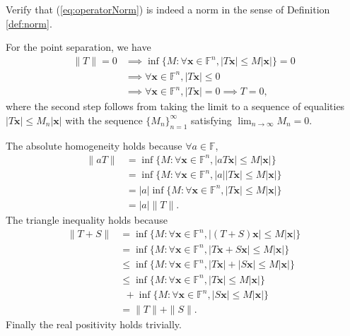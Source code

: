 \begin{exc}
  Verify that (\ref{eq:operatorNorm})
  is indeed a norm in the sense of Definition \ref{def:norm}.
\end{exc}
\begin{solution}
  For the point separation, we have
  \begin{displaymath}
    \begin{array}{rl}
    \|T\| = 0 & \implies \inf\{M: \forall \mathbf{x} \in
                \mathbb{F}^n, |T\mathbf{x}| \leq M|\mathbf{x}|\} =0
      \\ &\implies \forall \mathbf{x} \in \mathbb{F}^n,
           |T\mathbf{x}| \leq 0
      \\ &\implies \forall \mathbf{x} \in \mathbb{F}^n, |T\mathbf{x}| = 0 \implies T = 0,
    \end{array}
  \end{displaymath}
  where the second step follows from
  taking the limit to a sequence of equalities
  $|T\mathbf{x}|\le M_n |\mathbf{x}|$
  with the sequence $\{M_n\}_{n=1}^{\infty}$
  satisfying $\lim_{n\rightarrow \infty} M_n = 0$.

  The absolute homogeneity holds because $\forall a \in \mathbb{F}$, 
  \begin{displaymath}
    \begin{array}{rl}
      \|aT\| &= \inf\{M:\forall \mathbf{x} \in \mathbb{F}^n,|aT
               \mathbf{x} | \leq M|\mathbf{x}|\}
      \\ &= \inf\{M:\forall \mathbf{x} \in
           \mathbb{F}^n,|a||T\mathbf{x}| \leq M|\mathbf{x}|\}
      \\ &= |a|\inf\{M:\forall \mathbf{x} \in
           \mathbb{F}^n,|T\mathbf{x}| \leq M|\mathbf{x}|\}
      \\ &= |a|\|T\|.
    \end{array}
  \end{displaymath}
  The triangle inequality holds because
  \begin{displaymath}
    \begin{array}{rl}
      \|T + S\| &= \inf\{M: \forall \mathbf{x} \in \mathbb{F}^n,
                  |(T+S)\mathbf{x}| \leq M|\mathbf{x}|\}\\
        &= \inf\{M:\forall \mathbf{x} \in \mathbb{F}^n,
          |T\mathbf{x}+S\mathbf{x}| \leq M|\mathbf{x}|\} \\
        &\leq \inf\{M:\forall \mathbf{x} \in \mathbb{F}^n,
          |T\mathbf{x}|+|S\mathbf{x}| \leq M|\mathbf{x}|\}\\
      &\leq \inf\{M:\forall \mathbf{x} \in \mathbb{F}^n,
        |T\mathbf{x}| \leq M|\mathbf{x}|\} \\
        &\ \  + \inf\{M:\forall \mathbf{x} \in \mathbb{F}^n,
          |S\mathbf{x}| \leq M|\mathbf{x}|\}\\
      &= \|T\| + \|S\|.
    \end{array}
  \end{displaymath}
  Finally the real positivity holds trivially.
\end{solution}

